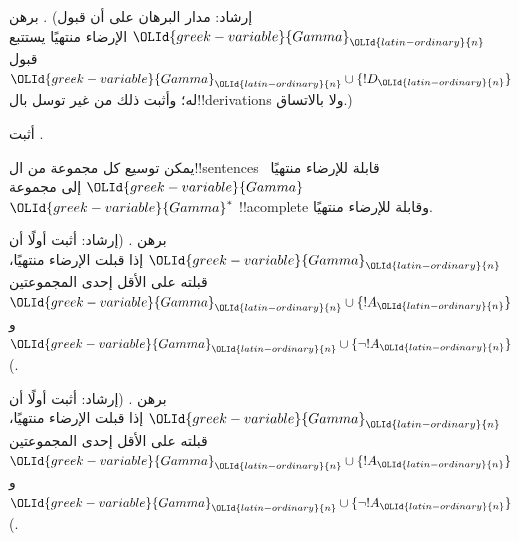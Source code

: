 \documentclass[../../../include/open-logic-section]{subfiles}
\begin{document}
\begin{prob}
برهن . (إرشاد: مدار البرهان
على أن قبول $\OLId{greek-variable}{Gamma}_\OLId{latin-ordinary}{n}$ الإرضاء منتهيًا يستتبع قبول
$\OLId{greek-variable}{Gamma}_\OLId{latin-ordinary}{n} \cup \{!D_\OLId{latin-ordinary}{n}\}$ له؛ وأثبت ذلك من غير توسل بال!!{derivation}s
ولا بالاتساق.)
\end{prob}
\tagendprob


\begin{prob}
أثبت .
\end{prob}
\tagendprob

\begin{lem}
 يمكن توسيع كل مجموعة من ال!!{sentence}s
قابلة للإرضاء منتهيًا~$\OLId{greek-variable}{Gamma}$ إلى مجموعة~$\OLId{greek-variable}{Gamma}^*$ !!a{complete}
وقابلة للإرضاء منتهيًا.
\end{lem}

\begin{prob}
برهن . (إرشاد: أثبت أولًا
أن $\OLId{greek-variable}{Gamma}_\OLId{latin-ordinary}{n}$ إذا قبلت الإرضاء منتهيًا، قبلته على الأقل إحدى
المجموعتين $\OLId{greek-variable}{Gamma}_\OLId{latin-ordinary}{n} \cup \{!A_\OLId{latin-ordinary}{n}\}$ و
$\OLId{greek-variable}{Gamma}_\OLId{latin-ordinary}{n} \cup \{\lnot !A_\OLId{latin-ordinary}{n}\}$.)
\end{prob}
\tagendprob

\begin{prob}
برهن . (إرشاد: أثبت أولًا
أن $\OLId{greek-variable}{Gamma}_\OLId{latin-ordinary}{n}$ إذا قبلت الإرضاء منتهيًا، قبلته على الأقل إحدى
المجموعتين $\OLId{greek-variable}{Gamma}_\OLId{latin-ordinary}{n} \cup \{!A_\OLId{latin-ordinary}{n}\}$ و
$\OLId{greek-variable}{Gamma}_\OLId{latin-ordinary}{n} \cup \{\lnot !A_\OLId{latin-ordinary}{n}\}$.)
\end{prob}
\tagendprob
\end{document}

